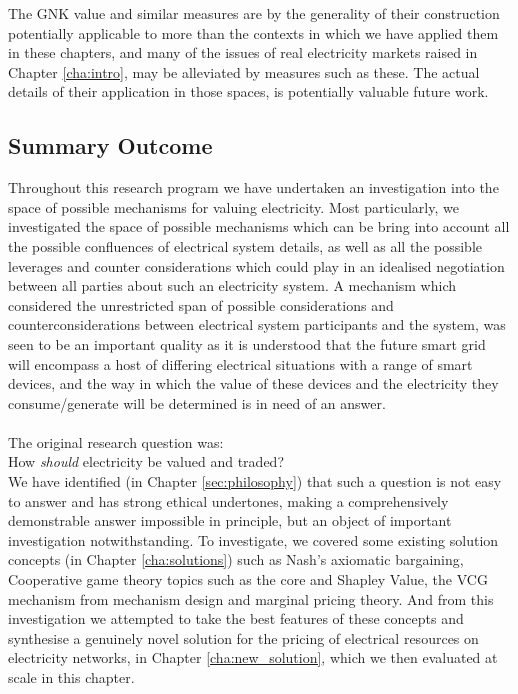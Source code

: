 The GNK value and similar measures are by the generality of their construction potentially applicable to more than the contexts in which we have applied them in these chapters, and many of the issues of real electricity markets raised in Chapter \ref{cha:intro}, may be alleviated by measures such as these.
The actual details of their application in those spaces, is potentially valuable future work.


\subsection{Summary Outcome}
\label{cha:conc}

Throughout this research program we have undertaken an investigation into the space of possible mechanisms for valuing electricity.
Most particularly, we investigated the space of possible mechanisms which can be bring into account all the possible confluences of electrical system details, as well as all the possible leverages and counter considerations which could play in an idealised negotiation between all parties about such an electricity system.
A mechanism which considered the unrestricted span of possible considerations and counterconsiderations between electrical system participants and the system, was seen to be an important quality as it is understood that the future smart grid will encompass a host of differing electrical situations with a range of smart devices, and the way in which the value of these devices and the electricity they consume/generate will be determined is in need of an answer.\\
\\\noindent
The original research question was:\\
\-\hspace{1cm}How \textit{should} electricity be valued and traded?\\

We have identified (in Chapter \ref{sec:philosophy}) that such a question is not easy to answer and has strong ethical undertones, making a comprehensively demonstrable answer impossible in principle, but an object of important investigation notwithstanding.
To investigate, we covered some existing solution concepts (in Chapter \ref{cha:solutions}) such as Nash's axiomatic bargaining, Cooperative game theory topics such as the core and Shapley Value, the VCG mechanism from mechanism design and marginal pricing theory.
And from this investigation we attempted to take the best features of these concepts and synthesise a genuinely novel solution for the pricing of electrical resources on electricity networks, in Chapter \ref{cha:new_solution}, which we then evaluated at scale in this chapter.

